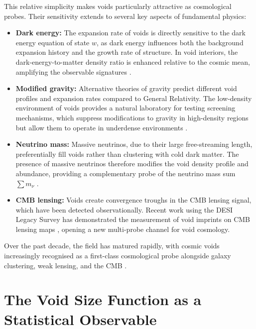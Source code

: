 \documentclass[12pt]{report}
\begin{document}
This relative simplicity makes voids particularly attractive as cosmological probes. Their sensitivity extends to several key aspects of fundamental physics:

\begin{itemize}
    \item \textbf{Dark energy:} The expansion rate of voids is directly sensitive to the dark energy equation of state $w$, as dark energy influences both the background expansion history and the growth rate of structure. In void interiors, the dark-energy-to-matter density ratio is enhanced relative to the cosmic mean, amplifying the observable signatures \citep{Pisani2015,Pisani2019MNRAS}.

    \item \textbf{Modified gravity:} Alternative theories of gravity predict different void profiles and expansion rates compared to General Relativity. The low-density environment of voids provides a natural laboratory for testing screening mechanisms, which suppress modifications to gravity in high-density regions but allow them to operate in underdense environments \citep{Li2012,Contarini2021}.

    \item \textbf{Neutrino mass:} Massive neutrinos, due to their large free-streaming length, preferentially fill voids rather than clustering with cold dark matter. The presence of massive neutrinos therefore modifies the void density profile and abundance, providing a complementary probe of the neutrino mass sum $\sum m_\nu$ \citep{Massara2015,Contarini2021}.

    \item \textbf{CMB lensing:} Voids create convergence troughs in the CMB lensing signal, which have been detected observationally. Recent work using the DESI Legacy Survey has demonstrated the measurement of void imprints on CMB lensing maps \citep{Aubert2024}, opening a new multi-probe channel for void cosmology.
\end{itemize}

Over the past decade, the field has matured rapidly, with cosmic voids increasingly recognised as a first-class cosmological probe alongside galaxy clustering, weak lensing, and the CMB \citep{Pisani2019WhitePaper,Moresco2022,Hamaus2023}.


\section{The Void Size Function as a Statistical Observable}
\end{document}
